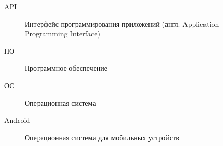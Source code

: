 \Abbreviations %
\begin{description}
\item[API] Интерфейс программирования приложений (англ. Application Programming Interface)
\item[ПО] Программное обеспечение
\item[ОС] Операционная система
\item[Android]  Операционная система для мобильных устройств
\end{description}

